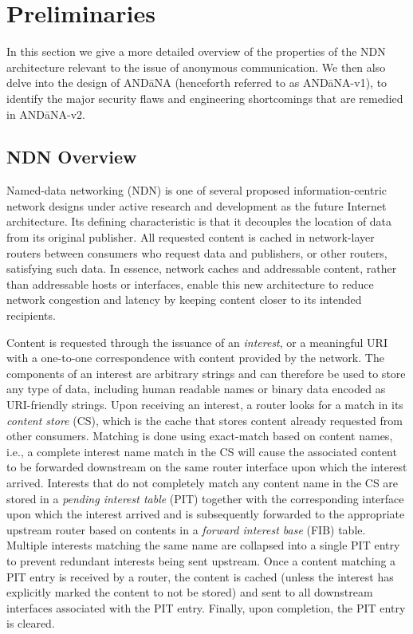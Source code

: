 \section{Preliminaries} \label{sec:preliminaries}
In this section we give a more detailed overview of the properties of the NDN architecture relevant to the issue of anonymous communication. We then also delve into the design of AND\=aNA (henceforth referred to as AND\=aNA-v1), to identify the major security flaws and engineering shortcomings that are remedied in AND\=aNA-v2. 

\subsection{NDN Overview}
Named-data networking (NDN) is one of several proposed information-centric network designs under active research and development as the future Internet architecture. Its defining characteristic is that it decouples the location of data from its original publisher. All requested content is cached in network-layer routers between consumers who request data and publishers, or other routers, satisfying such data. In essence, network caches and addressable content, rather than addressable hosts or interfaces, enable this new architecture to reduce network congestion and latency by keeping content closer to its intended recipients. 

Content is requested through the issuance of an \emph{interest}, or a meaningful URI with a one-to-one correspondence with content provided by the network. The components of an interest are arbitrary strings and can therefore be used to store any type of data, including human readable names or binary data encoded as URI-friendly strings. Upon receiving an interest, a router looks for a match in its \emph{content store} (CS), which is the cache that stores content already requested from other consumers. Matching is done using exact-match based on content names, i.e., a complete interest name match in the CS will cause the associated content to be forwarded downstream on the same router interface upon which the interest arrived. Interests that do not completely match any content name in the CS are stored in a \emph{pending interest table} (PIT) together with the corresponding interface upon which the interest arrived and is subsequently forwarded to the appropriate upstream router based on contents in a \emph{forward interest base} (FIB) table. Multiple interests matching the same name are collapsed into a single PIT entry to prevent redundant interests being sent upstream. Once a content matching a PIT entry is received by a router, the content is cached (unless the interest has explicitly marked the content to not be stored) and sent to all downstream interfaces associated with the PIT entry. Finally, upon completion, the PIT entry is cleared.

